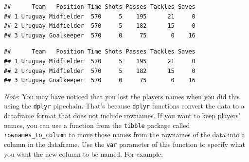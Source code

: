 \documentclass[]{book}
\makeatletter
\newenvironment{Shaded}{\begin{snugshade}}{\end{snugshade}}
\newcommand{\KeywordTok}[1]{\textcolor[rgb]{0.13,0.29,0.53}{\textbf{#1}}}
\newcommand{\DataTypeTok}[1]{\textcolor[rgb]{0.13,0.29,0.53}{#1}}
\newcommand{\DecValTok}[1]{\textcolor[rgb]{0.00,0.00,0.81}{#1}}
\newcommand{\StringTok}[1]{\textcolor[rgb]{0.31,0.60,0.02}{#1}}
\newcommand{\OperatorTok}[1]{\textcolor[rgb]{0.81,0.36,0.00}{\textbf{#1}}}
\newcommand{\NormalTok}[1]{#1}
\newenvironment{kframe}{%
\medskip{}
\setlength{\fboxsep}{.8em}
 \def\at@end@of@kframe{}%
 \ifinner\ifhmode%
  \def\at@end@of@kframe{\end{minipage}}%
  \begin{minipage}{\columnwidth}%
 \fi\fi%
 \def\FrameCommand##1{\hskip\@totalleftmargin \hskip-\fboxsep
 \colorbox{shadecolor}{##1}\hskip-\fboxsep
     \hskip-\linewidth \hskip-\@totalleftmargin \hskip\columnwidth}%
 \MakeFramed {\advance\hsize-\width
   \@totalleftmargin\z@ \linewidth\hsize
   \@setminipage}}%
 {\par\unskip\endMakeFramed%
 \at@end@of@kframe}
\renewenvironment{Shaded}{\begin{kframe}}{\end{kframe}}
\theoremstyle{definition}
\theoremstyle{definition}
\theoremstyle{definition}
\theoremstyle{remark}
\makeatother
\begin{document}
\begin{Shaded}
\end{Shaded}

\begin{verbatim}
##      Team   Position Time Shots Passes Tackles Saves
## 1 Uruguay Midfielder  570     5    195      21     0
## 2 Uruguay Midfielder  570     5    182      15     0
## 3 Uruguay Goalkeeper  570     0     75       0    16
\end{verbatim}

\begin{Shaded}
\end{Shaded}

\begin{verbatim}
##      Team   Position Time Shots Passes Tackles Saves
## 1 Uruguay Midfielder  570     5    195      21     0
## 2 Uruguay Midfielder  570     5    182      15     0
## 3 Uruguay Goalkeeper  570     0     75       0    16
\end{verbatim}

\emph{Note}: You may have noticed that you lost the players names when
you did this using the \texttt{dplyr} pipechain. That's because
\texttt{dplyr} functions convert the data to a dataframe format that
does not include rownames. If you want to keep players' names, you can
use a function from the \texttt{tibble} package called
\texttt{rownames\_to\_column} to move those names from the rownames of
the data into a column in the dataframe. Use the \texttt{var} parameter
of this function to specify what you want the new column to be named.
For example:

\begin{Shaded}
\end{Shaded}
\end{document}
